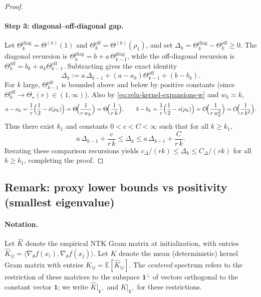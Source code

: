\begin{proof}
\medskip
\paragraph{Step 3: diagonal--off-diagonal gap.}
Let \(\Theta^{\mathrm{diag}}_k=\Theta^{(k)}(1)\) and \(\Theta^{\mathrm{off}}_k=\Theta^{(k)}(\rho_1)\), and set \(\Delta_k=\Theta^{\mathrm{diag}}_k-\Theta^{\mathrm{off}}_k\ge 0\). The diagonal recursion is \(\Theta^{\mathrm{diag}}_k=b+a\,\Theta^{\mathrm{diag}}_{k-1}\), while the off-diagonal recursion is \(\Theta^{\mathrm{off}}_k=b_k+a_k\Theta^{\mathrm{off}}_{k-1}\). Subtracting gives the exact identity
\[
\Delta_k
:=a\,\Delta_{k-1} + (a-a_k)\Theta^{\mathrm{off}}_{k-1} + (b-b_k).
\]
For \(k\) large, \(\Theta^{\mathrm{off}}_{k-1}\) is bounded above and below by positive constants (since \(\Theta^{\mathrm{off}}_k\to\Theta_\star(r)\in(1,\infty)\)). Also by \eqref{eq:relu-kernel-expansions-w} and \(w_k\asymp k\),
\[
a-a_k=\frac{1}{r}\Bigl(\frac12-\dot{s}(\rho_k)\Bigr)=\Theta\!\Big(\frac{1}{r\,w_k}\Big)=\Theta\!\Big(\frac{1}{r\,k}\Big),
\qquad
b-b_k=\frac{1}{r}\Bigl(\frac12-s(\rho_k)\Bigr)=O\!\Big(\frac{1}{r\,w_k^2}\Big)=O\!\Big(\frac{1}{r\,k^2}\Big).
\]
Thus there exist \(k_1\) and constants \(0<c<C<\infty\) such that for all \(k\ge k_1\),
\[
a\,\Delta_{k-1}+\frac{c}{r\,k}\le \Delta_k\le a\,\Delta_{k-1}+\frac{C}{r\,k}.
\]
Iterating these comparison recursions yields \(c_\Delta/(rk)\le \Delta_k\le C_\Delta/(rk)\) for all \(k\ge k_1\), completing the proof.
\end{proof}

\subsection{Remark: proxy lower bounds vs positivity (smallest eigenvalue)}\label{appendix:lambda-min-negative}
\paragraph{Notation.}
Let \(\widehat{K}\) denote the empirical NTK Gram matrix at initialization, with entries \(\widehat{K}_{ij}=\langle \nabla_\theta f(x_i),\nabla_\theta f(x_j)\rangle\). Let \(K\) denote the mean (deterministic) kernel Gram matrix with entries \(K_{ij}=\mathbb{E}[\widehat{K}_{ij}]\). The \emph{centered} spectrum refers to the restriction of these matrices to the subspace \(\mathbf{1}^\perp\) of vectors orthogonal to the constant vector \(\mathbf{1}\); we write \(\widehat{K}|_{\mathbf{1}^\perp}\) and \(K|_{\mathbf{1}^\perp}\) for these restrictions.

